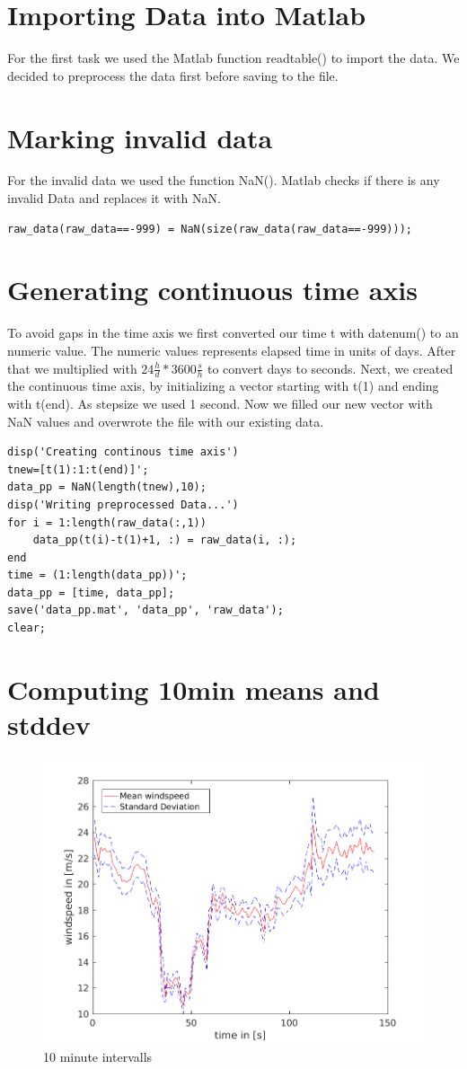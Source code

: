 \documentclass[10pt]{article}
\begin{document}
\lstset{
	language=Matlab,
	basicstyle=\footnotesize,
	frame=tb,
	xleftmargin=.2\textwidth,
	xrightmargin=.2\textwidth
}
\onehalfspacing

\tableofcontents
\newpage
\section{Importing Data into Matlab}
For the first task we used the Matlab function readtable() to import the data. We decided to preprocess the data first before saving to the file.
\section{Marking invalid data}
For the invalid data we used the function NaN(). Matlab checks if there is any invalid Data and replaces it with NaN.\\
\begin{lstlisting}
raw_data(raw_data==-999) = NaN(size(raw_data(raw_data==-999)));
\end{lstlisting}
\section{Generating continuous time axis}
To avoid gaps in the time axis we first converted our time t with datenum() to an numeric value. The numeric values represents elapsed time in units of days. After that we multiplied with $24\frac{h}{d}*3600\frac{s}{h}$ to convert days to seconds. 
Next, we created the continuous time axis, by initializing a vector starting with t(1) and ending with t(end). As stepsize we used 1 second. 
Now we filled our new vector with NaN values and overwrote the file with our existing data.\\
\begin{lstlisting}
disp('Creating continous time axis')
tnew=[t(1):1:t(end)]';
data_pp = NaN(length(tnew),10);
disp('Writing preprocessed Data...')
for i = 1:length(raw_data(:,1))
    data_pp(t(i)-t(1)+1, :) = raw_data(i, :);
end
time = (1:length(data_pp))';
data_pp = [time, data_pp];
save('data_pp.mat', 'data_pp', 'raw_data');
clear;
\end{lstlisting}
\section{Computing 10min means and stddev}
\begin{figure}[htb!]
  \centering
  \includegraphics[width=1\linewidth]{../Plots/mean_intervall_withstd.png}
  \caption{10 minute intervalls}\end{figure}
\end{document}
